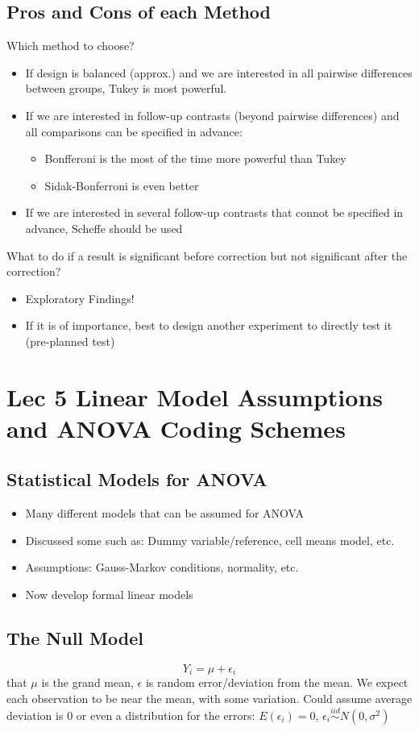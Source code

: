 \documentclass[a4paper,11pt]{article}
\begin{document}
\subsection{Pros and Cons of each Method}
Which method to choose? 
\begin{itemize}
\item If design is balanced (approx.) and we are interested in all pairwise differences between groups, Tukey is most powerful. 
\item If we are interested in follow-up contrasts (beyond pairwise differences) and all comparisons can be specified in advance: 
\begin{itemize}
\item Bonfferoni is the most of the time more powerful than Tukey
\item Sidak-Bonferroni is even better
\end{itemize}
\item If we are interested in several follow-up contrasts that connot be specified in advance, Scheffe should be used
\end{itemize}
What to do if a result is significant before correction but not significant after the correction?
\begin{itemize}
\item Exploratory Findings!
\item If it is of importance, best to design another experiment to directly test it (pre-planned test)
\end{itemize}

\section{Lec 5 Linear Model Assumptions and ANOVA Coding Schemes}
\subsection{Statistical Models for ANOVA}
\begin{itemize}
\item Many different models that can be assumed for ANOVA
\item Discussed some such as: Dummy variable/reference, cell means model, etc.
\item Assumptions: Gauss-Markov conditions, normality, etc. 
\item Now develop formal linear models
\end{itemize}
\subsection{The Null Model}
$$Y_i=\mu+\epsilon_i$$
that $\mu$ is the grand mean, $\epsilon$ is random error/deviation from the mean. We expect each observation to be near the mean, with some variation. Could assume average deviation is 0 or even a distribution for the errors: $E(\epsilon_i)=0$, $\epsilon_i\stackrel{iid}{\sim}N(0,\sigma^2)$
\end{document}
